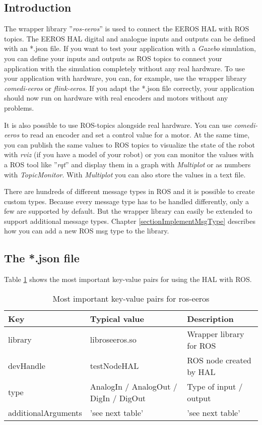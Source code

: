 \subsection{Introduction}
The wrapper library ''\textit{ros-eeros}'' is used to connect the EEROS HAL with ROS topics.
The EEROS HAL digital and analogue inputs and outputs can be defined with an *.json file.
If you want to test your application with a \textit{Gazebo} simulation, you can define your inputs and outputs as ROS topics to connect your application with the simulation completely without any real hardware.
To use your application with hardware, you can, for example, use the wrapper library \textit{comedi-eeros} or \textit{flink-eeros}.
If you adapt the *.json file correctly, your application should now run on hardware with real encoders and motors without any problems.

It is also possible to use ROS-topics alongside real hardware.
You can use \textit{comedi-eeros} to read an encoder and set a control value for a motor.
At the same time, you can publish the same values to ROS topics to visualize the state of the robot with \textit{rviz} (if you have a model of your robot) or you can monitor the values with a ROS tool like ''\textit{rqt}'' and display them in a graph with \textit{Multiplot} or as numbers with \textit{TopicMonitor}.
With \textit{Multiplot} you can also store the values in a text file.

There are hundreds of different message types in ROS and it is possible to create custom types.
Because every message type has to be handled differently, only a few are supported by default.
But the wrapper library can easily be extended to support additional message types.
Chapter \ref{sectionImplementMsgType} describes how you can add a new ROS msg type to the library.


\subsection{The *.json file}
Table \ref{tableKeyValueEeros} shows the most important key-value pairs for using the HAL with ROS.

\begin{table}[]
\centering
\caption{Most important key-value pairs for ros-eeros}
\label{tableKeyValueEeros}
\begin{tabular}{@{}lll@{}}
\toprule
Key                 & Typical value                         & Description              \\ \midrule
library             & libroseeros.so                        & Wrapper library  for ROS \\
devHandle           & testNodeHAL                           & ROS node created by HAL  \\
type                & AnalogIn / AnalogOut / DigIn / DigOut & Type of input / output   \\ 
additionalArguments & 'see next table'                      & 'see next table'         \\ \bottomrule
\end{tabular}
\end{table}

